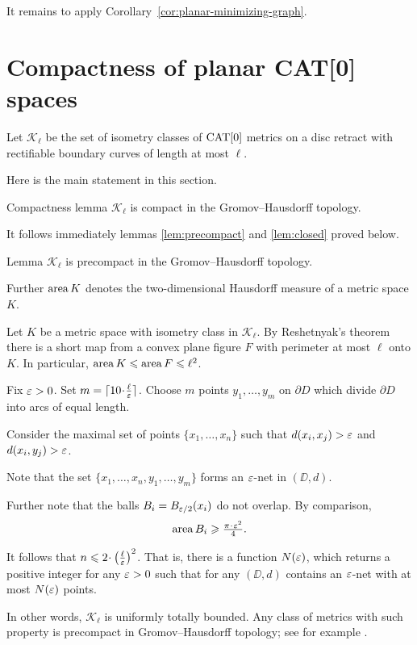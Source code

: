 \documentclass[a4paper,10pt]{amsart}
\begin{document}
It remains to apply Corollary~\ref{cor:planar-minimizing-graph}.
\qeds

\section{Compactness of planar CAT[0] spaces}

Let $\mathcal{K}_\ell$ be the set of isometry classes of $\mathop{\rm CAT}\nolimits[0]$ metrics on a disc retract with rectifiable
boundary curves of length at most $\ell$.


Here is the main statement in this section.

\begin{thm}{Compactness lemma}\label{lem:compact}
$\mathcal{K}_\ell$ is compact in the Gromov--Hausdorff topology.
\end{thm}

It follows immediately lemmas \ref{lem:precompact} and \ref{lem:closed} proved below.

\begin{thm}{Lemma}\label{lem:precompact}
$\mathcal{K}_\ell$ is precompact in the Gromov--Hausdorff topology.
\end{thm}

Further $\mathop{\rm area}\nolimits K$ denotes the two-dimensional Hausdorff measure of a metric space $K$. 

Let $K$ be a metric space with isometry class in $\mathcal {K}_\ell$.
By Reshetnyak's theorem there is a short map from a convex plane figure $F$ with perimeter at most $\ell$ onto $K$.
In particular, $\mathop{\rm area}\nolimits K \leqslant \mathop{\rm area}\nolimits F 
\leqslant \ell^2$.

Fix $\varepsilon>0$. 
Set $m=\lceil 10\cdot\tfrac\ell\eps\rceil$.
Choose $m$ points $y_1,\dots,y_m$ on $\partial D$
which divide $\partial D$ into arcs of equal length.

Consider the maximal set of points $\{x_1,\dots,x_n\}$ such that $d(x_i,x_j)>\varepsilon$ and $d(x_i,y_j)>\varepsilon$.

Note that the set $\{x_1,\dots,x_n,y_1,\dots,y_m\}$
forms an $\varepsilon$-net in $(\DD,d)$.

Further note that the balls $B_i=B_{\varepsilon/2}(x_i)$
do not overlap.
By comparison,
\[\area B_i\ge \tfrac{\pi\cdot\eps^2}{4}.\]

It follows that $n\le 2\cdot\left(\tfrac\ell\eps\right)^2$.
That is, there is a function $N(\varepsilon)$,
which returns a positive integer for any $\varepsilon>0$
such that for any 
$(\DD,d)$ contains an $\varepsilon$-net
with at most $N(\varepsilon)$ points.

In other words, $\mathcal{K}_\ell$ is uniformly totally bounded.
Any class of metrics with such property is precompact in Gromov--Hausdorff topology; 
see for example \cite[7.4.15]{BBI}.
\qeds
\end{document}
